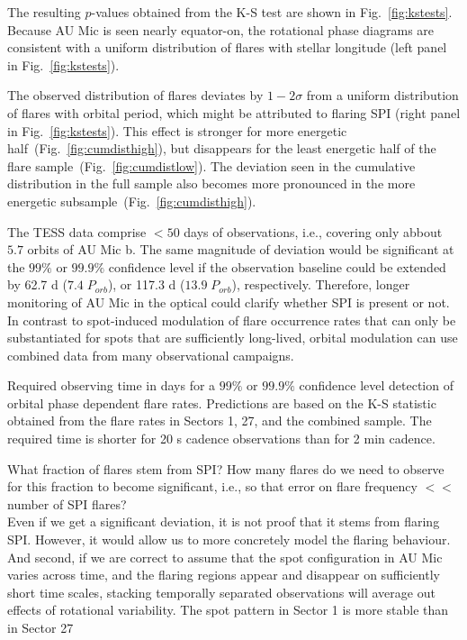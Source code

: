 \documentclass[fleqn,usenatbib,letters]{mnras}%
\begin{document}
The resulting $p$-values obtained from the K-S test are shown in Fig.~\ref{fig:kstests}. Because AU Mic is seen nearly equator-on, the rotational phase diagrams are consistent with a uniform distribution of flares with stellar longitude (left panel in Fig.~\ref{fig:kstests}). 

The observed distribution of flares deviates by $1-2\sigma$ from a uniform distribution of flares with orbital period, which might be attributed to flaring SPI (right panel in Fig.~\ref{fig:kstests}). This effect is stronger for more energetic half~(Fig.~\ref{fig:cumdisthigh}), but disappears for the least energetic half of the flare sample~(Fig.~\ref{fig:cumdistlow}). The deviation seen in the cumulative distribution in the full sample also becomes more pronounced in the more energetic subsample~(Fig.~\ref{fig:cumdisthigh}). 

The TESS data comprise $<50$ days of observations, i.e., covering only abbout $5.7$ orbits of AU Mic b. The same magnitude of deviation would be significant at the $99\%$ or  $99.9\%$ confidence level if the observation baseline could be extended by  62.7 d ($7.4\;P_{orb}$), or 117.3 d ($13.9\;P_{orb}$), respectively. Therefore, longer monitoring of AU Mic in the optical could clarify whether SPI is present or not. In contrast to spot-induced modulation of flare occurrence rates that can only be substantiated for spots that are sufficiently long-lived, orbital modulation can use combined data from many observational campaigns. 
\begin{table}
\caption{Required observing time in days for a $99\%$ or $99.9\%$ confidence level detection of orbital phase dependent flare rates. Predictions are based on the K-S statistic obtained from the flare rates in Sectors 1, 27, and the combined sample. The required time is shorter for 20 s cadence observations than for 2 min cadence.}
\centering

\label{tab:prediction}
\end{table}
What fraction of flares stem from SPI? How many flares do we need to observe for this fraction to become significant, i.e., so that error on flare frequency $<<$ number of SPI flares?
\\
Even if we get a significant deviation, it is not proof that it stems from flaring SPI. However, it would allow us to more concretely model the flaring behaviour. And second, if we are correct to assume that the spot configuration in AU Mic varies across time, and the flaring regions appear and disappear on sufficiently short time scales, stacking temporally separated observations will average out effects of rotational variability. The spot pattern in Sector 1 is more stable than in Sector 27~\citep{martioli2021}
\end{document}
